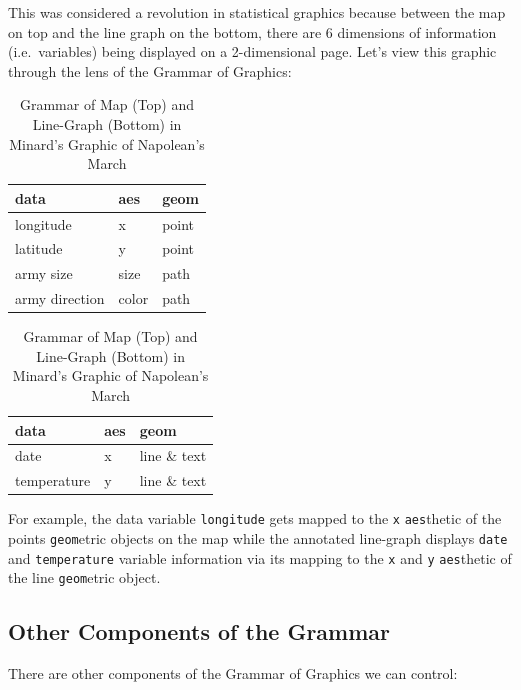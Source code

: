 \documentclass[]{tufte-book}
\begin{document}
This was considered a revolution in statistical graphics because between
the map on top and the line graph on the bottom, there are 6 dimensions
of information (i.e.~variables) being displayed on a 2-dimensional page.
Let's view this graphic through the lens of the Grammar of Graphics:

\begin{table}
\caption{\label{tab:unnamed-chunk-17}Grammar of Map (Top) and Line-Graph (Bottom) in Minard's Graphic of Napolean's March}

\centering
\begin{tabular}[t]{lll}
\toprule
data & aes & geom\\
\midrule
longitude & x & point\\
latitude & y & point\\
army size & size & path\\
army direction & color & path\\
\bottomrule
\end{tabular}
\centering
\begin{tabular}[t]{lll}
\toprule
data & aes & geom\\
\midrule
date & x & line \& text\\
temperature & y & line \& text\\
\bottomrule
\end{tabular}
\end{table}

For example, the data variable \texttt{longitude} gets mapped to the
\texttt{x} \texttt{aes}thetic of the points \texttt{geom}etric objects
on the map while the annotated line-graph displays \texttt{date} and
\texttt{temperature} variable information via its mapping to the
\texttt{x} and \texttt{y} \texttt{aes}thetic of the line
\texttt{geom}etric object.

\subsection{Other Components of the
Grammar}\label{other-components-of-the-grammar}

There are other components of the Grammar of Graphics we can control:
\end{document}
